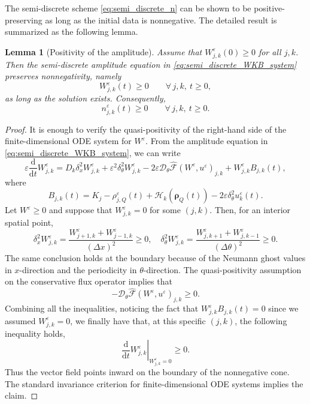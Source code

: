 \documentclass[11pt, dina4, amsfont12]{article}
\newtheorem{lemma}{Lemma}[section]
\begin{document}
The semi-discrete scheme \eqref{eq:semi_discrete_n} can be shown to be positive-preserving 
as long as the initial data is nonnegative. 
The detailed result is summarized as the following lemma. 

\begin{lemma}[Positivity of the amplitude]
\label{lem:positivity_W}
Assume that \(W_{j,k}^\varepsilon(0)\ge0\) for all \(j,k\). Then the
semi-discrete amplitude equation in \eqref{eq:semi_discrete_WKB_system}
preserves nonnegativity, namely
\[
    W_{j,k}^\varepsilon(t)\ge0
    \qquad
    \forall\,j,k,\ t\ge0,
\]
as long as the solution exists. Consequently,
\[
    n_{j,k}^\varepsilon(t)\ge0
    \qquad
    \forall\,j,k,\ t\ge0 .
\]
\end{lemma}

\begin{proof}
It is enough to verify the quasi-positivity of the right-hand side of the
finite-dimensional ODE system for \(W^\varepsilon\). From the amplitude
equation in \eqref{eq:semi_discrete_WKB_system}, we can write
\[
\varepsilon \frac{\mathrm d}{\mathrm dt}W_{j,k}^\varepsilon
=
D_k\delta_x^2W_{j,k}^\varepsilon
+
\varepsilon^2\delta_\theta^2W_{j,k}^\varepsilon
-
2\varepsilon
\mathcal D_\theta\widehat{\mathcal F}(W^\varepsilon,u^\varepsilon)_{j,k}
+
W_{j,k}^\varepsilon B_{j,k}(t),
\]
where
\[
B_{j,k}(t)
=
K_j-\rho_{j,Q}^\varepsilon(t)
+\mathcal H_k(\boldsymbol\rho_Q(t))
-2\varepsilon\delta_\theta^2u_k^\varepsilon(t).
\]
Let \(W^\varepsilon\ge0\) and suppose that
\(W_{j,k}^\varepsilon=0\) for some \((j,k)\). Then, for an interior spatial
point,
\[
\delta_x^2W_{j,k}^\varepsilon
=
\frac{W_{j+1,k}^\varepsilon+W_{j-1,k}^\varepsilon}{(\Delta x)^2}
\ge0, 
\quad 
\delta_\theta^2W_{j,k}^\varepsilon
=
\frac{W_{j,k+1}^\varepsilon+W_{j,k-1}^\varepsilon}{(\Delta\theta)^2}
\ge0 .
\]
The same conclusion holds at the boundary because of the Neumann ghost
values in $x$-direction and the periodicity in \(\theta\)-direction. 
The quasi-positivity assumption on the conservative flux operator implies that 
\[
    -
    \mathcal D_\theta\widehat{\mathcal F}(W^\varepsilon,u^\varepsilon)_{j,k}
    \ge0 .
\]
Combining all the inequalities, noticing the fact that 
\(
    W_{j,k}^\varepsilon B_{j,k}(t)=0 
\)
since we assumed $W_{j,k}^\varepsilon=0$, 
we finally have that, at this specific $(j,k)$, the following inequality holds, 
\[
\left.
\frac{\mathrm d}{\mathrm dt}W_{j,k}^\varepsilon
\right|_{W_{j,k}^\varepsilon=0}
\ge0 .
\]
Thus the vector field points inward on the boundary of the nonnegative cone.
The standard invariance criterion for finite-dimensional ODE systems implies
the claim.
\end{proof}
\end{document}
